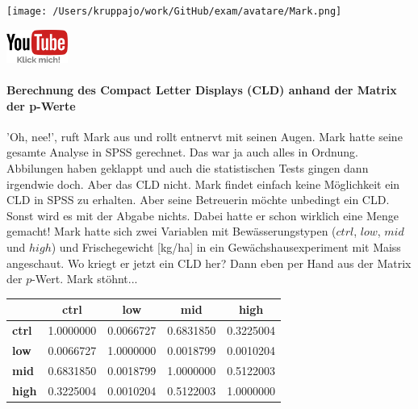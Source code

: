 \documentclass[a4paper, 9pt]{scrartcl}\usepackage[]{graphicx}\usepackage[]{xcolor}
\newenvironment{knitrout}{}{} %
\begin{document}
 
\begin{minipage}[t]{0.5\textwidth}
\texttt{[image: /Users/kruppajo/work/GitHub/exam/avatare/Mark.png]}
\end{minipage}
\begin{minipage}[t]{0.5\textwidth}
\hfill
\href{https://youtu.be/RagTFFKFbFg}{\includegraphics[width = 2cm]{img/youtube}}
\end{minipage}
\vspace{-3ex}



\paragraph{Berechnung des Compact Letter Displays (CLD) anhand der Matrix der p-Werte}

'Oh, nee!', ruft Mark aus und rollt entnervt mit seinen Augen. Mark hatte seine gesamte Analyse in SPSS gerechnet. Das war ja auch alles in Ordnung. Abbilungen haben geklappt und auch die statistischen Tests gingen dann irgendwie doch. Aber das CLD nicht. Mark findet einfach keine Möglichkeit ein CLD in SPSS zu erhalten. Aber seine Betreuerin möchte unbedingt ein CLD. Sonst wird es mit der Abgabe nichts. Dabei hatte er schon wirklich eine Menge gemacht! Mark hatte sich zwei Variablen mit Bewässerungstypen ($ctrl$, $low$, $mid$ und $high$) und Frischegewicht [kg/ha] in ein Gewächshausexperiment mit Maiss angeschaut. Wo kriegt er jetzt ein CLD her? Dann eben per Hand aus der Matrix der $p$-Wert. Mark stöhnt...

\begin{knitrout}
\color{fgcolor}\begin{table}[!h]
\centering\begingroup\fontsize{10}{12}\selectfont

\begin{tabular}{>{}lcccc}
\toprule
\textbf{ } & \textbf{ctrl} & \textbf{low} & \textbf{mid} & \textbf{high}\\
\midrule
\textbf{ctrl} & 1.0000000 & 0.0066727 & 0.6831850 & 0.3225004\\
\textbf{low} & 0.0066727 & 1.0000000 & 0.0018799 & 0.0010204\\
\textbf{mid} & 0.6831850 & 0.0018799 & 1.0000000 & 0.5122003\\
\textbf{high} & 0.3225004 & 0.0010204 & 0.5122003 & 1.0000000\\
\bottomrule
\end{tabular}
\endgroup{}
\end{table}

\end{knitrout}
\end{document}
